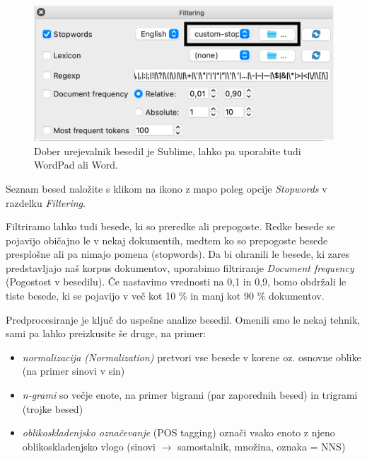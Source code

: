 \begin{figure}[h]
  \centering
  \includegraphics[width=\linewidth]{stop-words.png}%
  \caption{Dober urejevalnik besedil je Sublime, lahko pa uporabite tudi WordPad ali Word.}
  \label{fig:002-stop-words}
\end{figure}

Seznam besed naložite s klikom na ikono z mapo poleg opcije \textit{Stopwords} v razdelku \textit{Filtering}.

Filtriramo lahko tudi besede, ki so preredke ali prepogoste. Redke besede se pojavijo običajno le v nekaj dokumentih, medtem ko so prepogoste besede presplošne ali pa nimajo pomena (stopwords). Da bi ohranili le besede, ki zares predstavljajo naš korpus dokumentov, uporabimo filtriranje \textit{Document frequency} (Pogostost v besedilu). Če nastavimo vrednosti na 0,1 in 0,9, bomo obdržali le tiste besede, ki se pojavijo v več kot 10 \% in manj kot 90 \% dokumentov.

Predprocesiranje je ključ do uspešne analize besedil. Omenili smo le nekaj tehnik, sami pa lahko preizkusite še druge, na primer:

\begin{itemize}

\item \textit{normalizacija (Normalization)} pretvori vse besede v korene oz. osnovne oblike (na primer sinovi v sin)
\item \textit{n-grami} so večje enote, na primer bigrami (par zaporednih besed) in trigrami (trojke besed)
\item \textit{oblikoskladenjsko označevanje} (POS tagging) označi vsako enoto z njeno oblikoskladenjsko vlogo (sinovi $\rightarrow$ samostalnik, množina, oznaka = NNS)

\end{itemize}

